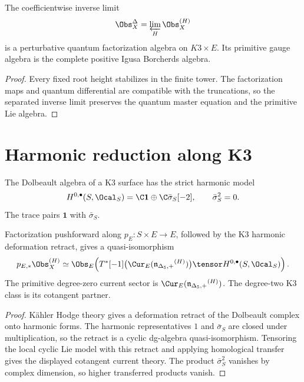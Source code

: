 \begin{corollary}
The coefficientwise inverse limit
\[
 \Obs_X^{\Delta}=\varprojlim_H\Obs_X^{(H)}
\]
is a perturbative quantum factorization algebra on $K3\times E$.  Its primitive gauge algebra is the complete positive Igusa Borcherds algebra.
\end{corollary}
\begin{proof}
Every fixed root height stabilizes in the finite tower.  The factorization maps and quantum differential are compatible with the truncations, so the separated inverse limit preserves the quantum master equation and the primitive Lie algebra.
\end{proof}

\chapter{Harmonic reduction along K3}
The Dolbeault algebra of a K3 surface has the strict harmonic model
\[
 H^{0,\bullet}(S,\Ocal_S)
 =\C\mathbf1\oplus\C\bar\sigma_S[-2],
 \qquad
 \bar\sigma_S^2=0.
\]
The trace pairs $\mathbf1$ with $\bar\sigma_S$.

\begin{theorem}
Factorization pushforward along $p_E:S\times E\to E$, followed by the K3 harmonic deformation retract, gives a quasi-isomorphism
\[
 p_{E,*}\Obs_X^{(H)}
 \simeq
 \Obs_E\!\left(
 T^*[-1]\bigl(\Cur_E(\nIg^{(H)})\bigr)
 \tensor H^{0,\bullet}(S,\Ocal_S)
 \right).
\]
The primitive degree-zero current sector is $\Cur_E(\nIg^{(H)})$.  The degree-two K3 class is its cotangent partner.
\end{theorem}
\begin{proof}
Kähler Hodge theory gives a deformation retract of the Dolbeault complex onto harmonic forms.  The harmonic representatives $1$ and $\bar\sigma_S$ are closed under multiplication, so the retract is a cyclic dg-algebra quasi-isomorphism.  Tensoring the local cyclic Lie model with this retract and applying homological transfer gives the displayed cotangent current theory.  The product $\bar\sigma_S^2$ vanishes by complex dimension, so higher transferred products vanish.
\end{proof}

